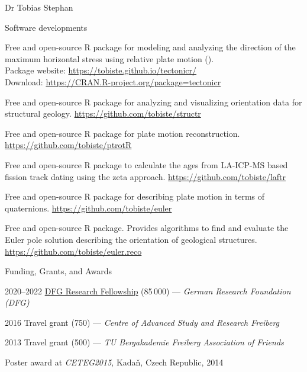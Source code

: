 \documentclass[10pt, paper=letter]{scrartcl} %
\begin{document}
\begin{cv}{Dr Tobias Stephan}
    
\begin{cvlist}{Software developments}
 \item[\textit{tectonicr}] Free and open-source R package for modeling and analyzing the direction of the maximum horizontal stress using relative plate motion ().\\
 Package website: \url{https://tobiste.github.io/tectonicr/}\\
 Download: \url{https://CRAN.R-project.org/package=tectonicr} 
 \item[\textit{structr}] Free and open-source R package for analyzing and visualizing orientation data for structural geology. 
 \url{https://github.com/tobiste/structr}
 \item[\textit{ptrotR}] Free and open-source R package for plate motion reconstruction. 
 \url{https://github.com/tobiste/ptrotR}
 \item[\textit{laftr}] Free and open-source R package to calculate the ages from LA-ICP-MS based fission track dating using the zeta approach. 
 \url{https://github.com/tobiste/laftr}
 \item[\textit{euler}] Free and open-source R package for describing plate motion in terms of quaternions.\newline
 \url{https://github.com/tobiste/euler}
 \item[\textit{euler.reco}] Free and open-source R package. Provides algorithms to find and evaluate the Euler pole solution describing the orientation of geological structures.\\
 \url{https://github.com/tobiste/euler.reco}
\end{cvlist}

\begin{cvlist}{Funding, Grants, and Awards}
        \item[Grants] 2020--2022 \href{https://gepris.dfg.de/gepris/projekt/439621066?language=en}{DFG Research Fellowship} (85\,000\texteuro) --- \textit{German Research Foundation (DFG)} 
        \item[] 2016 Travel grant (750\texteuro) --- \textit{Centre of Advanced Study and Research Freiberg}
        \item 2013 Travel grant (500\texteuro) --- \textit{TU Bergakademie Freiberg Association of Friends}
        \item[Awards] Poster award at \textit{CETEG2015}, Kada\v{n}, Czech Republic, 2014

    \end{cvlist}
    

\end{cv}
\end{document}
